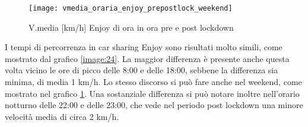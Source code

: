 \begin{figure}[H]
	\texttt{[image: vmedia\_oraria\_enjoy\_prepostlock\_weekend]}
	\caption{V.media [km/h] Enjoy di ora in ora pre e post lockdown}
	\label{image:25}
\end{figure}

I tempi di percorrenza in car sharing Enjoy sono risultati molto simili, come mostrato dal grafico \ref{image:24}. La maggior differenza è presente anche questa volta vicino le ore di picco delle 8:00 e delle 18:00, sebbene la differenza sia minima, di media 1 km/h. Lo stesso discorso si può fare anche nel weekend, come mostrato nel grafico \ref{image:25}. Una sostanziale differenza si può notare inoltre nell'orario notturno delle 22:00 e delle 23:00, che vede nel periodo post lockdown una minore velocità media di circa 2 km/h.













